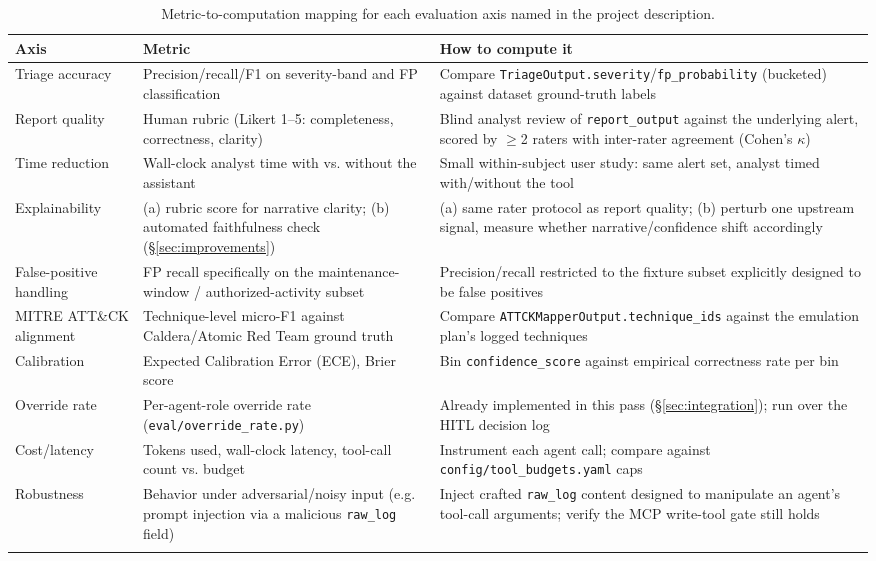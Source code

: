 \documentclass[11pt]{article}
\begin{document}
\begin{longtable}{@{}p{3.6cm}p{5.8cm}p{5.6cm}@{}}
\toprule
\textbf{Axis} & \textbf{Metric} & \textbf{How to compute it} \\
\midrule
\endhead
Triage accuracy & Precision/recall/F1 on severity-band and FP classification & Compare \texttt{TriageOutput.severity}/\texttt{fp\_probability} (bucketed) against dataset ground-truth labels \\
Report quality & Human rubric (Likert 1--5: completeness, correctness, clarity) & Blind analyst review of \texttt{report\_output} against the underlying alert, scored by $\geq$2 raters with inter-rater agreement (Cohen's $\kappa$) \\
Time reduction & Wall-clock analyst time with vs. without the assistant & Small within-subject user study: same alert set, analyst timed with/without the tool \\
Explainability & (a) rubric score for narrative clarity; (b) automated faithfulness check (\S\ref{sec:improvements}) & (a) same rater protocol as report quality; (b) perturb one upstream signal, measure whether narrative/confidence shift accordingly \\
False-positive handling & FP recall specifically on the maintenance-window / authorized-activity subset & Precision/recall restricted to the fixture subset explicitly designed to be false positives \\
MITRE ATT\&CK alignment & Technique-level micro-F1 against Caldera/Atomic Red Team ground truth & Compare \texttt{ATTCKMapperOutput.technique\_ids} against the emulation plan's logged techniques \\
Calibration & Expected Calibration Error (ECE), Brier score & Bin \texttt{confidence\_score} against empirical correctness rate per bin \\
Override rate & Per-agent-role override rate (\texttt{eval/override\_rate.py}) & Already implemented in this pass (\S\ref{sec:integration}); run over the HITL decision log \\
Cost/latency & Tokens used, wall-clock latency, tool-call count vs. budget & Instrument each agent call; compare against \texttt{config/tool\_budgets.yaml} caps \\
Robustness & Behavior under adversarial/noisy input (e.g. prompt injection via a malicious \texttt{raw\_log} field) & Inject crafted \texttt{raw\_log} content designed to manipulate an agent's tool-call arguments; verify the MCP write-tool gate still holds \\
\bottomrule
\caption{Metric-to-computation mapping for each evaluation axis named in the project description.}
\end{longtable}
\end{document}
